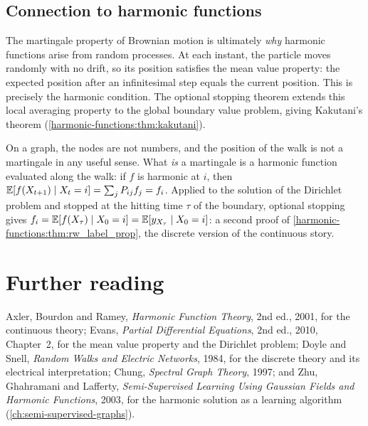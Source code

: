 \begin{notechapter}
\subsection*{Connection to harmonic functions}

The martingale property of Brownian motion is ultimately \emph{why}
harmonic functions arise from random processes. At each instant, the
particle moves randomly with no drift, so its position satisfies the mean
value property: the expected position after an infinitesimal step equals the
current position. This is precisely the harmonic condition. The optional
stopping theorem extends this local averaging property to the global
boundary value problem, giving Kakutani's theorem
(\cref{harmonic-functions:thm:kakutani}).

On a graph, the nodes are not numbers, and the position of the walk is not a
martingale in any useful sense. What \emph{is} a martingale is a harmonic function
evaluated along the walk: if $f$ is harmonic at $i$, then $\mathbb{E}[f(X_{t+1})\mid X_t = i] = \sum_jP_{ij}f_j = f_i$. Applied to the solution
of the Dirichlet problem and stopped at the hitting time $\tau$ of the boundary, optional stopping
gives $f_i = \mathbb{E}[f(X_\tau)\mid X_0 = i] = \mathbb{E}[y_{X_\tau}\mid X_0 = i]$: a second proof of \cref{harmonic-functions:thm:rw_label_prop}, the
discrete version of the continuous story.


\section*{Further reading}
Axler, Bourdon and Ramey, \emph{Harmonic Function Theory}, 2nd ed., 2001, for the continuous theory;
Evans, \emph{Partial Differential Equations}, 2nd ed., 2010, Chapter~2, for the mean value property and the
Dirichlet problem; Doyle and Snell, \emph{Random Walks and Electric Networks}, 1984, for the
discrete theory and its electrical interpretation; Chung, \emph{Spectral Graph Theory}, 1997; and
Zhu, Ghahramani and Lafferty, \emph{Semi-Supervised Learning Using Gaussian Fields and
Harmonic Functions}, 2003, for the harmonic solution as a learning algorithm
(\cref{ch:semi-supervised-graphs}).


\end{notechapter}
